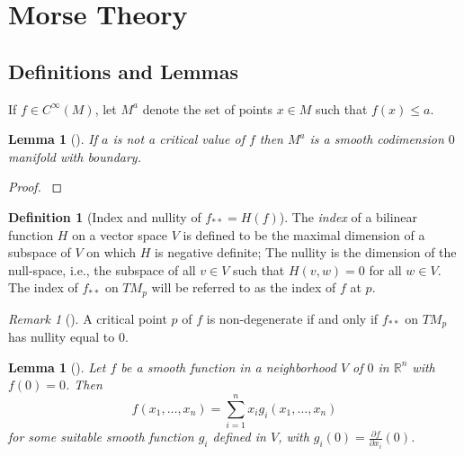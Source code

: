 \documentclass[reqno]{amsart}
\newtheorem{lemma}[theorem]{Lemma}
\theoremstyle{definition}
\newtheorem{definition}[theorem]{Definition}
\theoremstyle{remark}
\newtheorem*{remark}{Remark}
\begin{document}
        
        


    \section{Morse Theory}

    \subsection{Definitions and Lemmas}

    If $f \in C^{\infty}(M)$, let
    $M^{a}$ denote the set of points
    $x \in M$ such that $f(x) \le a$.

    \begin{lemma}[]
        If $a$ is not a critical value of $f$ then
        $M^{a}$ is a smooth codimension $0$ 
        manifold with boundary.
    \end{lemma}

    \begin{proof}
        \cite[Prop. 5.47]{LeeSM}
    \end{proof}

    \begin{definition}[Index and nullity of
        $f_{* *} = H(f)$]
        The \textit{index} of a bilinear function
        $H$ on a vector space $V$ is defined to
        be the maximal dimension of a subspace of
        $V$ on which $H$ is negative definite;
        The nullity is the dimension of the 
        null-space, i.e., the subspace of
        all $v \in V$ such that
        $H(v,w) = 0$ for all
        $w \in V$.\\
        The index of $f_{* *}$ on $TM_p$ will be referred
        to as the index of $f$ at $p$.
    \end{definition}

    \begin{remark}[]
        A critical point
        $p$ of $f$ is non-degenerate
        if and only if
        $f_{* *}$ on $TM_p$ has nullity equal to
        $0$.
    \end{remark}







    \begin{lemma}[]
        Let $f$ be a smooth function in a neighborhood
        $V$ of $0$ in $\mathbb{R}^{n}$ with
        $f(0) = 0$. Then
        \[
        f(x_1, \ldots, x_n) = 
        \sum_{i=1}^{n} x_i g_i\left( x_1, \ldots, x_n \right) 
        \] 
        for some suitable smooth function
        $g_i$ defined in $V$, with
        $g_i(0) = \frac{\partial f}{\partial x_i}(0)$.
    \end{lemma}
\end{document}
